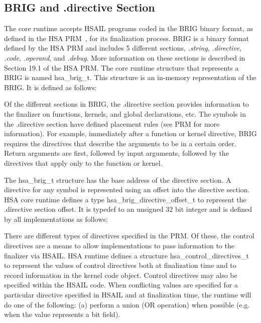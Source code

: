 \documentclass{book}
\newcommand{\reftyp}[1]{#1}
\begin{document}
\begin{appendices}
\subsection{BRIG and .directive Section}
The core runtime accepts HSAIL programs coded in the
BRIG binary format, as defined in the HSA PRM~\cite{prm}, for its
finalization process. BRIG is a binary format defined by the HSA
PRM and includes 5 different sections, \emph{.string},
\emph{.directive}, \emph{.code}, \emph{.operand}, and \emph{.debug}.
More information on these sections is described in Section 19.1 of
the HSA PRM. The core runtime structure that represents a
BRIG is named \reftyp{hsa\_brig\_t}. This structure is an in-memory
representation of the BRIG. It is defined as follows:



Of the different sections in BRIG, the .directive section provides
information to the finalizer on functions, kernels, and global
declarations, etc. The symbols in the .directive section have defined
placement rules (see PRM for more information). For example,
immediately after a function or kernel directive, BRIG requires the
directives that describe the arguments to be in a certain order.
Return arguments are first, followed by input arguments, followed by
the directives that apply only to the function or kernel.

The \reftyp{hsa\_brig\_t} structure has the base address of the
directive section. A directive for any symbol is represented using
an offset into the directive section. HSA core runtime defines a
type \reftyp{hsa\_brig\_directive\_offset\_t} to represent the
.directive section offset. It is typedef to an unsigned 32 bit
integer and is defined by all implementations as follows:



There are different types of directives specified in the PRM. Of
these, the control directives are a means to allow implementations
to pass information to the finalizer via HSAIL. HSA runtime
defines a structure \reftyp{hsa\_control\_directives\_t} to
represent the values of control directives both at finalization
time and to record information in the kernel code object. Control
directives may also be specified within the HSAIL code. When
conflicting values are specified for a particular directive
specified in HSAIL and at finalization time, the runtime will do one
of the following: (a) perform a union (OR operation) when possible
(e.g. when the value represents a bit field).


\end{appendices}
\end{document}
